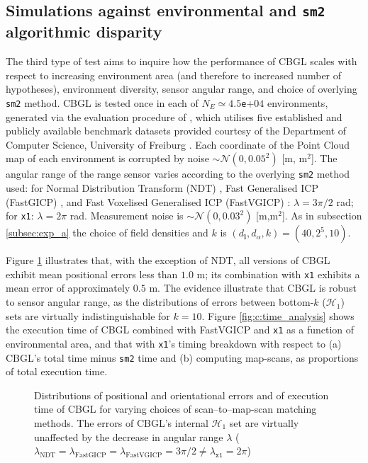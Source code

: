 \subsection{Simulations against environmental and \texttt{sm2} algorithmic disparity}
\label{subsec:exp_c}

The third type of test aims to inquire how the performance of CBGL scales with
respect to increasing environment area (and therefore to increased number of
hypotheses), environment diversity, sensor angular range, and choice of
overlying \texttt{sm2} method. CBGL is tested once in each of $N_E \simeq
4.5$\texttt{e}+$04$ environments, generated via the evaluation procedure of
\cite{Filotheou2023a}, which utilises five established and publicly available
benchmark datasets provided courtesy of the Department of Computer Science,
University of Freiburg \cite{datasets_link}. Each coordinate of the Point Cloud
map of each environment is corrupted by noise $\sim\mathcal{N}(0,0.05^2)$ [m,
m$^2$].  The angular range of the range sensor varies according to the
overlying \texttt{sm2} method used: for Normal Distribution Transform (NDT)
\cite{ndt}, Fast Generalised ICP (FastGICP) \cite{fgi}, and Fast Voxelised
Generalised ICP (FastVGICP) \cite{fvg}: $\lambda = 3\pi/2$ rad; for
\texttt{x1}: $\lambda = 2\pi$ rad. Measurement noise is $\sim
\mathcal{N}(0,0.03^2)$ [m,m$^2$]. As in subsection \ref{subsec:exp_a} the
choice of field densities and $k$ is $(d_{\bm{l}},d_{\alpha},k) = (40, 2^5,
10)$.

Figure \ref{fig:c:errors_and_time} illustrates that, with the exception of NDT,
all versions of CBGL exhibit mean positional errors less than $1.0$ m; its
combination with \texttt{x1} exhibits a mean error of approximately $0.5$ m.
The evidence illustrate that CBGL is robust to sensor angular range, as the
distributions of errors between bottom-$k$ ($\mathcal{H}_1$) sets are
virtually indistinguishable for $k=10$. Figure \ref{fig:c:time_analysis} shows
the execution time of CBGL combined with FastVGICP and \texttt{x1} as a
function of environmental area, and that with \texttt{x1}'s timing breakdown
with respect to (a) CBGL's total time minus \texttt{sm2} time and (b) computing
map-scans, as proportions of total execution time.

\begin{figure}
  \vspace{0.3cm}
  
  \vspace{0.1cm}
  \caption{\small Distributions of positional and orientational errors and of
           execution time of CBGL for varying choices of scan--to--map-scan
           matching methods. The errors of CBGL's internal $\mathcal{H}_1$ set
           are virtually unaffected by the decrease in angular range $\lambda$
           ($\lambda_{\text{NDT}} = \lambda_{\text{FastGICP}} =
           \lambda_{\text{FastVGICP}} = 3\pi/2 \neq \lambda_{\texttt{x1}} = 2\pi$)
           }
  \label{fig:c:errors_and_time}
\end{figure}

